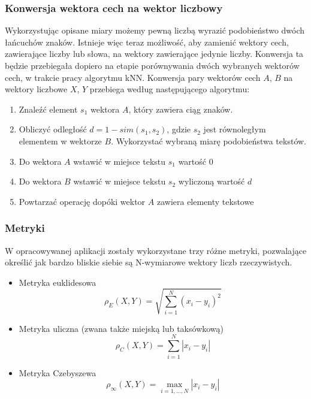 \documentclass{classrep}
\begin{document}
{{            \subsubsection{Konwersja wektora cech na wektor liczbowy} {
                Wykorzystując opisane miary możemy pewną liczbą wyrazić podobieństwo dwóch łańcuchów znaków.
                Istnieje więc teraz możliwość, aby zamienić wektory cech, zawierające liczby lub słowa, na wektory
                zawierające jedynie liczby. Konwersja ta będzie przebiegała dopiero na etapie porównywania
                dwóch wybranych wektorów cech, w trakcie pracy algorytmu kNN. Konwersja pary wektorów cech $A$, $B$
                na wektory liczbowe $X$, $Y$ przebiega według następującego algorytmu:
                \begin{enumerate}
                    \item Znaleźć element $s_1$ wektora $A$, który zawiera ciąg znaków.
                    \item Obliczyć odległość $d = 1 - sim(s_1, s_2)$, gdzie $s_2$ jest równoległym
                    elementem w wektorze $B$. Wykorzystać wybraną miarę podobieństwa tekstów.
                    \item Do wektora $A$ wstawić w miejsce tekstu $s_1$ wartość $0$
                    \item Do wektora $B$ wstawić w miejsce tekstu $s_2$ wyliczoną wartość $d$
                    \item Powtarzać operację dopóki wektor $A$ zawiera elementy tekstowe
                \end{enumerate}
            }

            \subsubsection{Metryki} \label{metryka}{
                W opracowywanej aplikacji zostały wykorzystane trzy różne metryki,
                pozwalające określić jak bardzo bliskie siebie są N-wymiarowe wektory liczb rzeczywistych.
                \begin{itemize}
                    \item Metryka euklidesowa
                    $$
                    \rho_E(X,Y)= \sqrt{\sum^N_{i=1} (x_i-y_i)^2}
                    $$
                    \item Metryka uliczna (zwana także miejską lub taksówkową)
                    $$
                    \rho_C(X,Y)=\sum^N_{i=1}|x_i-y_i|
                    $$
                    \item Metryka Czebyszewa
                    $$
                    \rho_{\infty}(X,Y)= \max_{i=1,...,N} |x_{i} - y_{i}|
                    $$
                \end{itemize}
            }
        }

}
\end{document}
